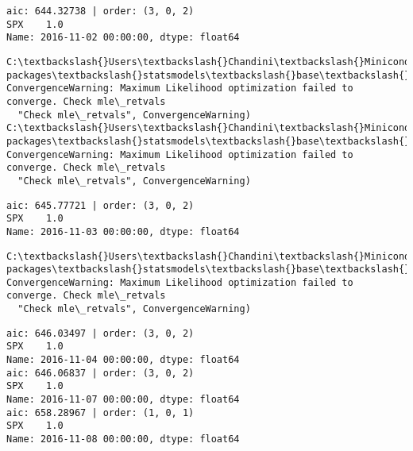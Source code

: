 \documentclass[11pt]{article}
\begin{document}
    \begin{Verbatim}[commandchars=\\\{\}]
aic: 644.32738 | order: (3, 0, 2)
SPX    1.0
Name: 2016-11-02 00:00:00, dtype: float64

    \end{Verbatim}

    \begin{Verbatim}[commandchars=\\\{\}]
C:\textbackslash{}Users\textbackslash{}Chandini\textbackslash{}Miniconda3\textbackslash{}envs\textbackslash{}auquan\textbackslash{}lib\textbackslash{}site-packages\textbackslash{}statsmodels\textbackslash{}base\textbackslash{}model.py:496: ConvergenceWarning: Maximum Likelihood optimization failed to converge. Check mle\_retvals
  "Check mle\_retvals", ConvergenceWarning)
C:\textbackslash{}Users\textbackslash{}Chandini\textbackslash{}Miniconda3\textbackslash{}envs\textbackslash{}auquan\textbackslash{}lib\textbackslash{}site-packages\textbackslash{}statsmodels\textbackslash{}base\textbackslash{}model.py:496: ConvergenceWarning: Maximum Likelihood optimization failed to converge. Check mle\_retvals
  "Check mle\_retvals", ConvergenceWarning)

    \end{Verbatim}

    \begin{Verbatim}[commandchars=\\\{\}]
aic: 645.77721 | order: (3, 0, 2)
SPX    1.0
Name: 2016-11-03 00:00:00, dtype: float64

    \end{Verbatim}

    \begin{Verbatim}[commandchars=\\\{\}]
C:\textbackslash{}Users\textbackslash{}Chandini\textbackslash{}Miniconda3\textbackslash{}envs\textbackslash{}auquan\textbackslash{}lib\textbackslash{}site-packages\textbackslash{}statsmodels\textbackslash{}base\textbackslash{}model.py:496: ConvergenceWarning: Maximum Likelihood optimization failed to converge. Check mle\_retvals
  "Check mle\_retvals", ConvergenceWarning)

    \end{Verbatim}

    \begin{Verbatim}[commandchars=\\\{\}]
aic: 646.03497 | order: (3, 0, 2)
SPX    1.0
Name: 2016-11-04 00:00:00, dtype: float64
aic: 646.06837 | order: (3, 0, 2)
SPX    1.0
Name: 2016-11-07 00:00:00, dtype: float64
aic: 658.28967 | order: (1, 0, 1)
SPX    1.0
Name: 2016-11-08 00:00:00, dtype: float64

    \end{Verbatim}
\end{document}
